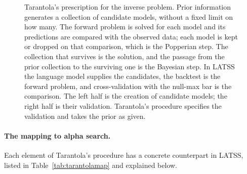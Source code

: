 \documentclass[11pt]{article}
\begin{document}
\begin{figure}[htbp]
\caption{Tarantola's prescription for the inverse problem. Prior information generates a collection of
candidate models, without a fixed limit on how many. The forward problem is solved for each model and its
predictions are compared with the observed data; each model is kept or dropped on that comparison, which
is the Popperian step. The collection that survives is the solution, and the passage from the prior
collection to the surviving one is the Bayesian step. In LATSS the language model supplies the candidates,
the backtest is the forward problem, and cross-validation with the null-max bar is the comparison. The
left half is the creation of candidate models; the right half is their validation. Tarantola's procedure
specifies the validation and takes the prior as given.}
\label{fig:tarantola}
\end{figure}

\paragraph{The mapping to alpha search.} Each element of Tarantola's procedure has a concrete
counterpart in LATSS, listed in Table~\ref{tab:tarantolamap} and explained below.
\end{document}
